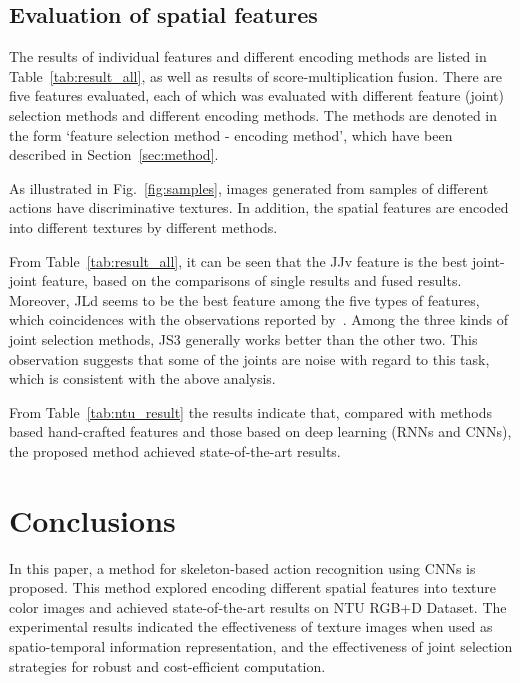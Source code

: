\documentclass[5pt]{article}
\begin{document}
\subsection{Evaluation of spatial features}
The results of individual features and different encoding methods are 
 listed in Table~\ref{tab:result_all}, as well as results of 
score-multiplication fusion. There are five features evaluated, each of which 
was evaluated with different feature (joint) selection methods and different 
encoding methods. The methods are denoted in the form `feature selection method 
- encoding method', which have been described in 
Section~\ref{sec:method}.
	 
As illustrated in Fig.~\ref{fig:samples}, images generated from samples 
of different actions have discriminative textures. In addition, the spatial 
features are encoded into different textures by different methods. 
	
From Table~\ref{tab:result_all}, it can be seen that the JJv feature is the best 
joint-joint feature, based on the comparisons of single results and fused 
results. Moreover, JLd seems to be the best feature among the five types of 
features, which coincidences with the observations reported by~\cite{Zhang2017}. 
Among the three kinds of joint selection methods, JS3 generally works better 
than the other two. This observation suggests that some of the joints are 
noise with regard to this task, which is consistent with the above analysis.
	
	
From Table~\ref{tab:ntu_result} the results indicate that, 
compared with methods based hand-crafted features and those based on deep 
learning (RNNs and CNNs), the proposed method achieved state-of-the-art 
results. 
	
\section{Conclusions}
\label{sec:conclusion}
In this paper, a method for skeleton-based action recognition using CNNs is 
proposed. This method explored encoding different spatial features into texture 
color images and achieved state-of-the-art results on NTU RGB+D Dataset. The 
experimental results indicated the effectiveness of texture images when used as 
 spatio-temporal information representation, and the effectiveness of joint 
selection strategies for robust and cost-efficient computation. 
	
\end{document}
